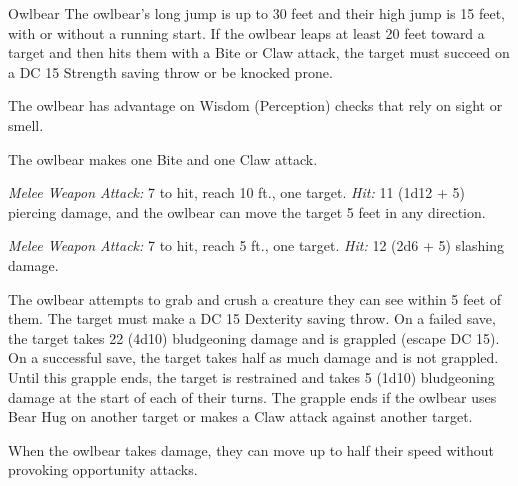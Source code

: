 \documentclass[10pt,a4paper,twoside,bg=print,twocolumn,openany,nodeprecatedcode]{dndbook}
\begin{document}
\begin{DndMonster}[float=t]{Owlbear}
\DndMonsterBasics[
armor-class = {13 (natural armor)},
hit-points = {\DndDice{11d10 + 22}},
speed = {40 ft.}
]
\DndMonsterAbilityScores[
 str = 21,
 dex = 12,
 con = 15,
 int = 5,
 wis = 12,
 cha = 6
]
\DndMonsterDetails[
skills = {Perception +3},
condition-immunities = {frightened},
senses = {darkvision 60 ft., passive perception 13},
challenge = 3,
]
The owlbear's long jump is up to 30 feet and their high jump is 15 feet, with or without a running start. If the owlbear leaps at least 20 feet toward a target and then hits them with a Bite or Claw attack, the target must succeed on a DC 15 Strength saving throw or be knocked prone.

The owlbear has advantage on Wisdom (Perception) checks that rely on sight or smell.

The owlbear makes one Bite and one Claw attack.

\textsl{Melee Weapon Attack:} 7 to hit, reach 10 ft., one target. \textsl{Hit:} 11 (1d12 + 5) piercing damage, and the owlbear can move the target 5 feet in any direction.

\textsl{Melee Weapon Attack:} 7 to hit, reach 5 ft., one target. \textsl{Hit:} 12 (2d6 + 5) slashing damage.

The owlbear attempts to grab and crush a creature they can see within 5 feet of them. The target must make a DC 15 Dexterity saving throw. On a failed save, the target takes 22 (4d10) bludgeoning damage and is grappled (escape DC 15). On a successful save, the target takes half as much damage and is not grappled. Until this grapple ends, the target is restrained and takes 5 (1d10) bludgeoning damage at the start of each of their turns. The grapple ends if the owlbear uses Bear Hug on another target or makes a Claw attack against another target.

When the owlbear takes damage, they can move up to half their speed without provoking opportunity attacks.

\end{DndMonster}
\end{document}
